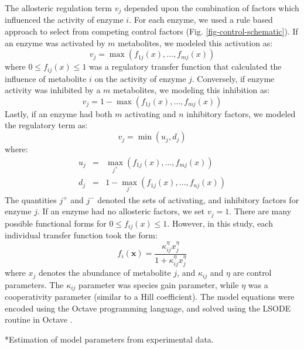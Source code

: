 \documentclass[12pt]{article}
\makeatletter
\renewcommand\subsection{\@startsection
	{subsection}{2}{0mm}
	{-0.05in}
	{-0.5\baselineskip}
	{\normalfont\normalsize\bfseries}}
\makeatother
\begin{document}
The allosteric regulation term $v_{j}$ depended upon the combination of factors which influenced the activity of enzyme $i$.
For each enzyme, we used a rule based approach to select from competing control factors (Fig. \ref{fig-control-schematic}). 
If an enzyme was activated by $m$ metabolites, we modeled this activation as:
\begin{equation}
	v_{j} = \max\left(f_{1j}\left(x\right),\hdots,f_{mj}\left(x\right)\right)
\end{equation}where $0\leq f_{ij}\left(x\right)\leq 1$ was a regulatory transfer function that calculated the influence of metabolite $i$ on the activity of enzyme $j$. 
Conversely, if enzyme activity was inhibited by a $m$ metabolites, we modeling this inhibition as:
\begin{equation}
	v_{j} = 1 - \max\left(f_{1j}\left(x\right),\hdots,f_{mj}\left(x\right)\right)
\end{equation}Lastly, if an enzyme had both $m$ activating and $n$ inhibitory factors, we modeled the regulatory term as:
\begin{equation}
	v_{j} = \min\left(u_{j},d_{j}\right)
\end{equation}where:
\begin{eqnarray}
	u_{j} &=& \max_{j^{+}}\left(f_{1j}\left(x\right),\hdots,f_{mj}\left(x\right)\right) \\
	d_{j} &=& 1 - \max_{j^{-}}\left(f_{1j}\left(x\right),\hdots,f_{nj}\left(x\right)\right)
\end{eqnarray}The quantities $j^{+}$ and $j^{-}$ denoted the sets of activating, and inhibitory factors for enzyme $j$. 
If an enzyme had no allosteric factors, we set $v_{j} = 1$.
There are many possible functional forms for $0\leq f_{ij}\left(x\right)\leq 1$. 
However, in this study, each individual transfer function took the form:
\begin{equation}\label{eqn:control-factor}
	f_{i}\left(\mathbf{x}\right) = \frac{\kappa_{ij}^{\eta}x_{j}^{\eta}}{1 + \kappa_{ij}^{\eta}x_{j}^{\eta}}
\end{equation}where $x_{j}$ denotes the abundance of metabolite $j$, and $\kappa_{ij}$ and $\eta$ are control parameters. 
The $\kappa_{ij}$ parameter was species gain parameter, while $\eta$ was a cooperativity parameter (similar to a Hill coefficient).
The model equations were encoded using the Octave programming language, and solved using the LSODE routine in Octave \citep{Octave:2014}.

\subsection*{Estimation of model parameters from experimental data.}
\end{document}
